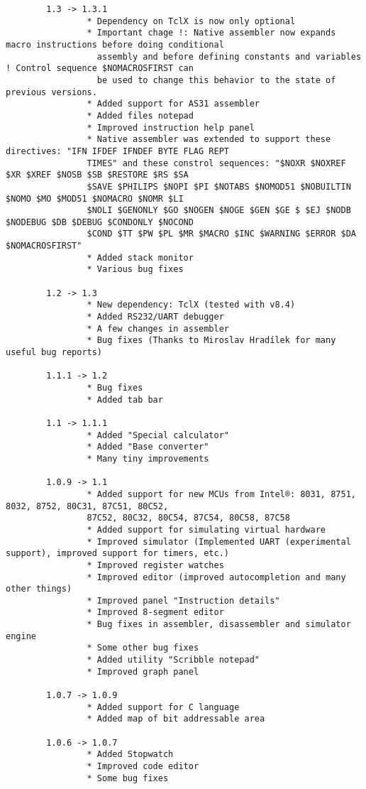 \documentclass[a4paper,twoside,12pt]{book}
\begin{document}
{\begin{verbatim}
		1.3 -> 1.3.1
		        * Dependency on TclX is now only optional
		        * Important chage !: Native assembler now expands macro instructions before doing conditional
		          assembly and before defining constants and variables ! Control sequence $NOMACROSFIRST can
		          be used to change this behavior to the state of previous versions.
		        * Added support for AS31 assembler
		        * Added files notepad
		        * Improved instruction help panel
		        * Native assembler was extended to support these directives: "IFN IFDEF IFNDEF BYTE FLAG REPT
		        TIMES" and these constrol sequences: "$NOXR $NOXREF $XR $XREF $NOSB $SB $RESTORE $RS $SA
		        $SAVE $PHILIPS $NOPI $PI $NOTABS $NOMOD51 $NOBUILTIN $NOMO $MO $MOD51 $NOMACRO $NOMR $LI
		        $NOLI $GENONLY $GO $NOGEN $NOGE $GEN $GE $ $EJ $NODB $NODEBUG $DB $DEBUG $CONDONLY $NOCOND
		        $COND $TT $PW $PL $MR $MACRO $INC $WARNING $ERROR $DA $NOMACROSFIRST"
		        * Added stack monitor
		        * Various bug fixes

		1.2 -> 1.3
		        * New dependency: TclX (tested with v8.4)
		        * Added RS232/UART debugger
		        * A few changes in assembler
		        * Bug fixes (Thanks to Miroslav Hradílek for many useful bug reports)

		1.1.1 -> 1.2
		        * Bug fixes
		        * Added tab bar

		1.1 -> 1.1.1
		        * Added "Special calculator"
		        * Added "Base converter"
		        * Many tiny improvements

		1.0.9 -> 1.1
		        * Added support for new MCUs from Intel®: 8031, 8751, 8032, 8752, 80C31, 87C51, 80C52,
		        87C52, 80C32, 80C54, 87C54, 80C58, 87C58
		        * Added support for simulating virtual hardware
		        * Improved simulator (Implemented UART (experimental support), improved support for timers, etc.)
		        * Improved register watches
		        * Improved editor (improved autocompletion and many other things)
		        * Improved panel "Instruction details"
		        * Improved 8-segment editor
		        * Bug fixes in assembler, disassembler and simulator engine
		        * Some other bug fixes
		        * Added utility "Scribble notepad"
		        * Improved graph panel

		1.0.7 -> 1.0.9
		        * Added support for C language
		        * Added map of bit addressable area

		1.0.6 -> 1.0.7
		        * Added Stopwatch
		        * Improved code editor
		        * Some bug fixes


\end{verbatim}}
\end{document}
